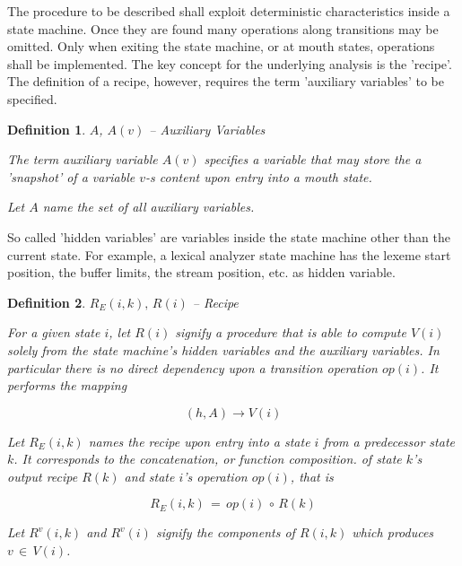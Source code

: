 \documentclass[12pt,a4paper]{scrartcl}
\newtheorem{definition}{Definition}
\begin{document}
The procedure to be described shall exploit deterministic characteristics
inside a state machine. Once they are found many operations along transitions
may be omitted. Only when exiting the state machine, or at mouth states,
operations shall be implemented. The key concept for the underlying
analysis is the 'recipe'. The definition of a recipe, however, requires
the term 'auxiliary variables' to be specified.

\begin{definition} $A$, $A(v)$ -- Auxiliary Variables

The term auxiliary variable $A(v)$ specifies a variable that may store the
a 'snapshot' of a variable $v$-s content upon entry into a mouth state. 
   
Let $A$ name the set of all auxiliary variables.
\end{definition}

So called 'hidden variables' are variables inside the state machine other than
the current state.  For example, a lexical analyzer state machine has the
lexeme start position, the buffer limits, the stream position, etc. as hidden
variable. 

\begin{definition} $R_E(i,k),\,R(i)$ -- Recipe 

For a given state $i$, let $R(i)$ signify a procedure that is able to compute
$V(i)$ solely from the state machine's hidden variables and the auxiliary variables.
In particular there is no direct dependency upon a transition operation $op(i)$.
It performs the mapping

\begin{equation} \label{eq:recipe-procedure}
    (h, A) \rightarrow V(i)                                             
\end{equation}

Let $R_E(i,k)$ names the recipe upon entry into a state $i$ from a predecessor
state $k$. It corresponds to the concatenation, or \textit{function
composition}. of state $k$'s output recipe $R(k)$ and state $i$'s operation
$op(i)$, that is

\begin{equation} \label{eq:entry-recipe-concatenated}
    R_E(i,k) \,=\, op(i)\, \circ \, R(k)
\end{equation}

Let $R^v(i,k)$ and $R^v(i)$ signify the components of $R(i,k)$ which produces
$v\,\in\,V(i)$.  
\end{definition}
\end{document}
